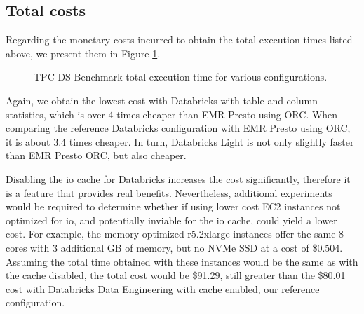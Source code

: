 \subsection{Total costs}\label{resultsSummaryTotalCost}

Regarding the monetary costs incurred to obtain the total execution times listed above, we present them in Figure \ref{fig:resultsSummaryTotalCosts}.

\begin{figure}
   \begin{center}
   \end{center}
   \caption{TPC-DS Benchmark total execution time for various configurations.}
   \label{fig:resultsSummaryTotalCosts}
\end{figure}

Again, we obtain the lowest cost with Databricks with table and column statistics, which is over 4 times cheaper than EMR Presto using ORC. When comparing the reference Databricks configuration with EMR Presto using ORC, it is about 3.4 times cheaper. In turn, Databricks Light is not only slightly faster than EMR Presto ORC, but also cheaper.

Disabling the io cache for Databricks increases the cost significantly, therefore it is a feature that provides real benefits. Nevertheless, additional experiments would be required to determine whether if using lower cost EC2 instances not optimized for io, and potentially inviable for the io cache, could yield a lower cost. For example, the memory optimized r5.2xlarge instances offer the same 8 cores with 3 additional GB of memory, but no NVMe SSD at a cost of \$0.504. Assuming the total time obtained with these instances would be the same as with the cache disabled, the total cost would be \$91.29, still greater than the \$80.01 cost with Databricks Data Engineering with cache enabled, our reference configuration.

